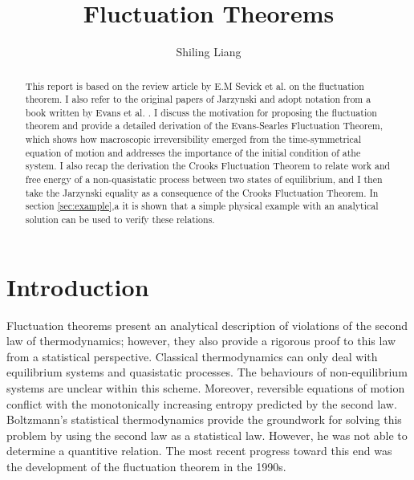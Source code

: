 \documentclass[ reprint, amsmath,amssymb, aps,]{revtex4-1}
\begin{document}
\title{Fluctuation Theorems}%



\author{Shiling Liang}
%


\begin{abstract}
This report is based on the review article
 by E.M Sevick et al.\cite{Sevick2007} on the fluctuation theorem. I also refer to the original papers of Jarzynski \cite{Jarzynski1997,Evans2002,Jarzynski2003} and adopt notation from a book written by Evans et al. \cite{evans2016fundamentals}. I discuss the motivation for proposing the fluctuation theorem and provide a detailed derivation of the Evans-Searles Fluctuation Theorem, which shows how macroscopic irreversibility emerged from the time-symmetrical equation of motion and addresses the importance of the initial condition of athe system. I also recap the derivation the Crooks Fluctuation Theorem to relate work and free energy of a non-quasistatic process between two states of equilibrium, and I then take the Jarzynski equality as a consequence of the Crooks Fluctuation Theorem. In section \ref{sec:example},a it is shown that a simple physical example with an analytical solution can be used to verify these relations.

\end{abstract}

\maketitle



\section{Introduction}

 Fluctuation theorems present an analytical description of violations of the second law of thermodynamics; however, they also provide a rigorous proof to this law from a statistical perspective. Classical thermodynamics can only deal with equilibrium systems and quasistatic processes. The behaviours of non-equilibrium systems are unclear within this scheme. Moreover, reversible equations of motion conflict with the monotonically increasing entropy predicted by the second law. Boltzmann's statistical thermodynamics provide the groundwork for solving this problem by using the second law as a statistical law. However, he was not able to determine a quantitive relation. The most recent progress toward this end was the development of the fluctuation theorem in the 1990s. 
 
\end{document}
